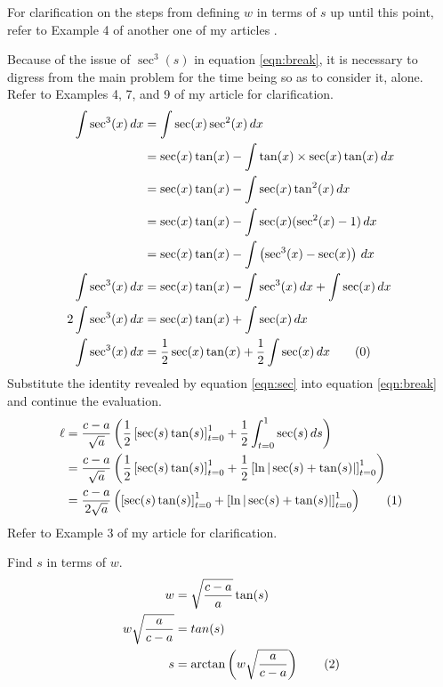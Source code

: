\documentclass{article}
\begin{document}
For clarification on the steps from defining $w$ in terms of $s$ up until this point, refer to Example 4 of another one of my articles \cite{Bib:Class1Var}.\par
Because of the issue of $\sec^3(s)$ in equation \ref{eqn:break}, it is necessary to digress from the main problem for the time being so as to consider it, alone. Refer to Examples 4, 7, and 9 of my article \cite{Bib:Class1Var} for clarification.
\begin{align*}
    \int \sec^3(x)\, dx &= \int \sec(x)\sec^2(x)\, dx\\
    &= \sec(x)\tan(x)-\int \tan(x)\times\sec(x)\tan(x)\, dx\\
    &= \sec(x)\tan(x)-\int \sec(x)\tan^2(x)\, dx\\
    &= \sec(x)\tan(x)-\int \sec(x)(\sec^2(x)-1)\, dx\\
    &= \sec(x)\tan(x)-\int \left(\sec^3(x)-\sec(x)\right)\, dx\\
    \int \sec^3(x)\, dx &= \sec(x)\tan(x)-\int \sec^3(x)\, dx+\int \sec(x)\, dx\\
    2\int \sec^3(x)\, dx &= \sec(x)\tan(x)+\int \sec(x)\, dx\\
    \int \sec^3(x)\, dx &= \frac{1}{2}\sec(x)\tan(x)+\frac{1}{2}\int \sec(x)\, dx\tag{\theequation}\label{eqn:sec}
    \stepcounter{equation}
\end{align*}
Substitute the identity revealed by equation \ref{eqn:sec} into equation \ref{eqn:break} and continue the evaluation.
\begin{align*}
    \ell &= \frac{c-a}{\sqrt{a}}\left(\frac{1}{2}\left[\sec(s)\tan(s)\right]_{t=0}^1+\frac{1}{2}\int_{t=0}^1 \sec(s)\, ds\right)\\
    &= \frac{c-a}{\sqrt{a}}\left(\frac{1}{2}\left[\sec(s)\tan(s)\right]_{t=0}^1+\frac{1}{2}\left[\ln|\sec(s)+\tan(s)|\right]_{t=0}^1\right)\\
    &= \frac{c-a}{2\sqrt{a}}\left(\left[\sec(s)\tan(s)\right]_{t=0}^1+\left[\ln|\sec(s)+\tan(s)|\right]_{t=0}^1\right)\tag{\theequation}\label{eqn:integrated}
    \stepcounter{equation}
\end{align*}
Refer to Example 3 of my article \cite{Bib:Class1Var} for clarification.\par
Find $s$ in terms of $w$.
\begin{align*}
    w &= \sqrt{\frac{c-a}{a}}\tan(s)\\
    w\sqrt{\frac{a}{c-a}} &= tan(s)\\
    s &= \arctan\left(w\sqrt{\frac{a}{c-a}}\right)\tag{\theequation}\label{eqn:SinW}
    \stepcounter{equation}
\end{align*}
\end{document}
